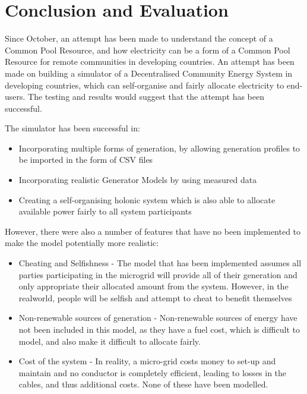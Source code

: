 \chapter{Conclusion and Evaluation}
\label{Conclusions}

Since October, an attempt has been made to understand the concept of a Common Pool Resource, and how electricity can be a form of a Common Pool Resource for remote communities in developing countries. An attempt has been made on building a simulator of a Decentralised Community Energy System in developing countries, which can self-organise and fairly allocate electricity to end-users. The testing and results would suggest that the attempt has been successful.

The simulator has been successful in:
\begin{itemize}
	\item Incorporating multiple forms of generation, by allowing generation profiles to be imported in the form of CSV files
	\item Incorporating realistic Generator Models by using measured data
	\item Creating a self-organising holonic system which is also able to allocate available power fairly to all system participants
\end{itemize}

However, there were also a number of features that have no been implemented to make the model potentially more realistic:
\begin{itemize}
	\item Cheating and Selfishness - The model that has been implemented assumes all parties participating in the microgrid will provide all of their generation and only appropriate their allocated amount from the system. However, in the realworld, people will be selfish and attempt to cheat to benefit themselves  
	\item Non-renewable sources of generation - Non-renewable sources of energy have not been included in this model, as they have a fuel cost, which is difficult to model, and also make it difficult to allocate fairly. 
	\item Cost of the system - In reality, a micro-grid costs money to set-up and maintain and no conductor is completely efficient, leading to losses in the cables, and thus additional costs. None of these have been modelled.
\end{itemize}

\section{}

